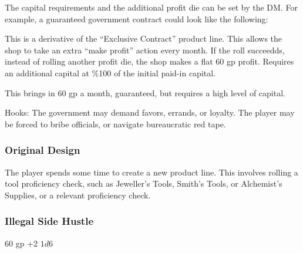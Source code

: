 \documentclass[twocolumn]{dndbook}
\begin{document}
The capital requirements and the additional profit die can be set by the DM.
For example, a guaranteed government contract could look like the following:

\begin{DndComment}[color=bgtan2018]{}
	This is a derivative of the ``Exclusive Contract'' product line.
	This allows the shop to take an extra ``make profit'' action every month.
	If the roll succeedds, instead of rolling another profit die, the shop makes a flat 60 gp profit.
	Requires an additional capital at \%100 of the initial paid-in capital.
\end{DndComment}



This brings in 60 gp a month, guaranteed, but requires a high level of capital.

Hooks: The government may demand favors, errands, or loyalty.
The player may be forced to bribe officials, or navigate bureaucratic red tape.\par

\subsubsection{Original Design}


The player spends some time to create a new product line.
This involves rolling a tool proficiency check, such as Jeweller's Tools, Smith's Tools, or
Alchemist's Supplies, or a relevant proficiency check.


\subsubsection{Illegal Side Hustle}


\begin{DndComment}[color=bgtan2018]{}
	\hfill 60 gp
	\hfill +2
	\hfill $1d6$
\end{DndComment}
\end{document}
